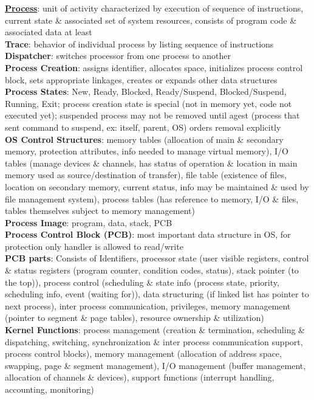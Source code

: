 \documentclass[a4paper]{article}
\begin{document}
    \begin{multicols}{2}
        \tiny
        \noindent\underline{\textbf{Process}}: unit of activity characterized by execution of sequence of instructions, current state \& associated set of system resources, consists of program code \& associated data at least\\
        \textbf{Trace}: behavior of individual process by listing sequence of instructions\\
        \textbf{Dispatcher}: switches processor from one process to another\\
        \textbf{Process Creation}: assigns identifier, allocates space, initializes process control block, sets appropriate linkages, creates or expands other data structures\\
        \textbf{Process States}: New, Ready, Blocked, Ready/Suspend, Blocked/Suspend, Running, Exit; process creation state is special (not in memory yet, code not executed yet); suspended process may not be removed until agest (process that sent command to suspend, ex: itself, parent, OS) orders removal explicitly\\
        \textbf{OS Control Structures}: memory tables (allocation of main \& secondary memory, protection attributes, info needed to manage virtual memory), I/O tables (manage devices \& channels, has status of operation \& location in main memory used as source/destination of transfer), file table (existence of files, location on secondary memory, current status, info may be maintained \& used by file management system), process tables (has reference to memory, I/O \& files, tables themselves subject to memory management)\\
        \textbf{Process Image}: program, data, stack, PCB\\
        \textbf{Process Control Block (PCB)}: most important data structure in OS, for protection only handler is allowed to read/write\\
        \textbf{PCB parts}: Consists of Identifiers, processor state (user visible registers, control \& status registers (program counter, condition codes, status), stack pointer (to the top)), process control (scheduling \& state info (process state, priority, scheduling info, event (waiting for)), data structuring (if linked list has pointer to next process), inter process communication, privileges, memory management (pointer to segment \& page tables), resource ownership \& utilization)\\
        \textbf{Kernel Functions}: process management (creation \& termination, scheduling \& dispatching, switching, synchronization \& inter process communication support, process control blocks), memory management (allocation of address space, swapping, page \& segment management), I/O management  (buffer management, allocation of channels \& devices), support functions (interrupt handling, accounting, monitoring)\\

\end{multicols}
\end{document}
